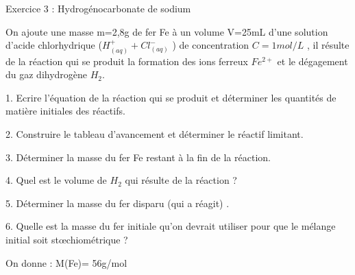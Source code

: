 \documentclass[12pt, french]{article}
\begin{document}
\begin{Box2}{Exercice 3 : Hydrogénocarbonate de sodium}
 
On ajoute une masse m=2,8g  de fer Fe à un volume V=25mL d’une solution d’acide chlorhydrique
($H^+_{(aq)} + Cl^-_{(aq)}$ ) de concentration $C=1mol/L$ , il résulte de la réaction qui se produit la formation des ions ferreux $Fe^{2+}$ et le dégagement du gaz dihydrogène $H_2$.

1. Ecrire l’équation de la réaction qui se produit et déterminer les quantités de matière initiales des réactifs.

2. Construire le tableau d’avancement et déterminer le réactif limitant.

3. Déterminer la masse du fer Fe restant à la fin de la réaction.

4. Quel est le volume de $H_2$ qui résulte de la réaction ?

   5. Déterminer la masse du fer disparu (qui a réagit) .

   6. Quelle est la masse du fer initiale qu’on devrait utiliser pour que le mélange initial soit stœchiométrique ?

On donne : M(Fe)= 56g/mol

\end{Box2}
\end{document}

